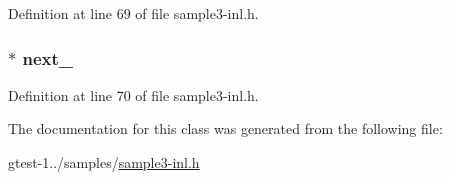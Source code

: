 \-Definition at line 69 of file sample3-\/inl.\-h.

\hypertarget{classQueueNode_a98370cb174d8ae9c27a6585ffc0afb17}{
\subsubsection[{next\-\_\-}]{$\ast$ {\bf next\-\_\-}}}\label{d0/d98/classQueueNode_a98370cb174d8ae9c27a6585ffc0afb17}


\-Definition at line 70 of file sample3-\/inl.\-h.



\-The documentation for this class was generated from the following file\-:\begin{DoxyCompactItemize}
\item 
gtest-\/1../samples/\hyperlink{sample3-inl_8h}{sample3-\/inl.\-h}\end{DoxyCompactItemize}
